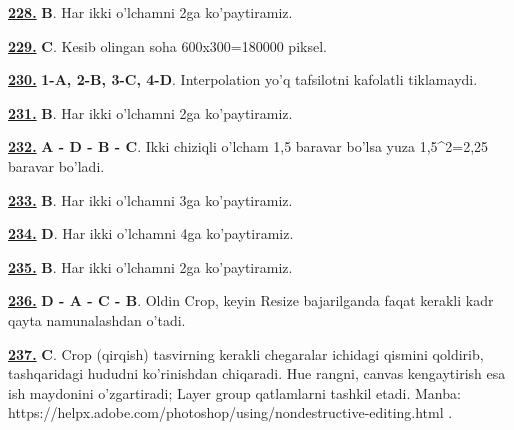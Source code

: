 \documentclass[10pt,a4paper,oneside]{article}
\begin{document}
\noindent\hyperlink{q228}{\textbf{228.}} \textbf{B}.  Har ikki o'lchamni 2ga ko'paytiramiz.
\par\vspace{3mm}
\noindent\hyperlink{q229}{\textbf{229.}} \textbf{C}.  Kesib olingan soha 600x300=180000 piksel.
\par\vspace{3mm}
\noindent\hyperlink{q230}{\textbf{230.}} \textbf{1-A, 2-B, 3-C, 4-D}.  Interpolation yo'q tafsilotni kafolatli tiklamaydi.
\par\vspace{3mm}
\noindent\hyperlink{q231}{\textbf{231.}} \textbf{B}.  Har ikki o'lchamni 2ga ko'paytiramiz.
\par\vspace{3mm}
\noindent\hyperlink{q232}{\textbf{232.}} \textbf{A - D - B - C}.  Ikki chiziqli o'lcham 1,5 baravar bo'lsa yuza 1,5\textasciicircum{}2=2,25 baravar bo'ladi.
\par\vspace{3mm}
\noindent\hyperlink{q233}{\textbf{233.}} \textbf{B}.  Har ikki o'lchamni 3ga ko'paytiramiz.
\par\vspace{3mm}
\noindent\hyperlink{q234}{\textbf{234.}} \textbf{D}.  Har ikki o'lchamni 4ga ko'paytiramiz.
\par\vspace{3mm}
\noindent\hyperlink{q235}{\textbf{235.}} \textbf{B}.  Har ikki o'lchamni 2ga ko'paytiramiz.
\par\vspace{3mm}
\noindent\hyperlink{q236}{\textbf{236.}} \textbf{D - A - C - B}.  Oldin Crop, keyin Resize bajarilganda faqat kerakli kadr qayta namunalashdan o'tadi.
\par\vspace{3mm}
\noindent\hyperlink{q237}{\textbf{237.}} \textbf{C}.  Crop (qirqish) tasvirning kerakli chegaralar ichidagi qismini qoldirib, tashqaridagi hududni ko'rinishdan chiqaradi. Hue rangni, canvas kengaytirish esa ish maydonini o'zgartiradi; Layer group qatlamlarni tashkil etadi. Manba: https://helpx.adobe.com/photoshop/using/nondestructive-editing.html .
\par\vspace{3mm}
\end{document}
